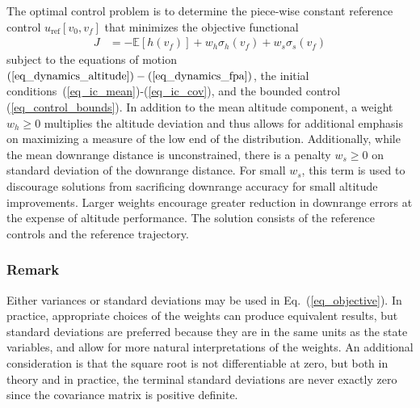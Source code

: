 \documentclass[journal ]{new-aiaa}
\newcommand{\ur}{\ensuremath{u_{\mathrm{ref}}}}
\newcommand{\E}[1]{\mathbb{E}\left[#1\right]}
\newcommand{\V}[1]{\mathbb{V}[#1]}
\begin{document}
The optimal control problem is to determine the piece-wise constant reference control $\ur\left[v_0,v_f\right]$ that minimizes the objective functional
\begin{align}
J &= -\E{h(v_f)} + w_h\sigma_h(v_f) + w_s\sigma_s(v_f) \label{eq_objective}
\end{align}
subject to the equations of motion $(\ref{eq_dynamics_altitude})-(\ref{eq_dynamics_fpa})$, the initial conditions~(\ref{eq_ic_mean})-(\ref{eq_ic_cov}), and the bounded control (\ref{eq_control_bounds}). 
In addition to the mean altitude component, a weight $w_h\ge0$ multiplies the altitude deviation and thus allows for additional emphasis on maximizing a measure of the low end of the distribution. Additionally, while the mean downrange distance is unconstrained, there is a penalty $w_s\ge0$ on standard deviation of the downrange distance. For small $w_s$, this term is used to discourage solutions from sacrificing downrange accuracy for small altitude improvements. Larger weights encourage greater reduction in downrange errors at the expense of altitude performance. The solution consists of the reference controls and the reference trajectory.

\subsubsection*{Remark} Either variances or standard deviations may be used in Eq.~(\ref{eq_objective}). In practice, appropriate choices of the weights can produce equivalent results, but standard deviations are preferred because they are in the same units as the state variables, and allow for more natural interpretations of the weights. An additional consideration is that the square root is not differentiable at zero, but both in theory and in practice, the terminal standard deviations are never exactly zero since the covariance matrix is positive definite.
\end{document}
